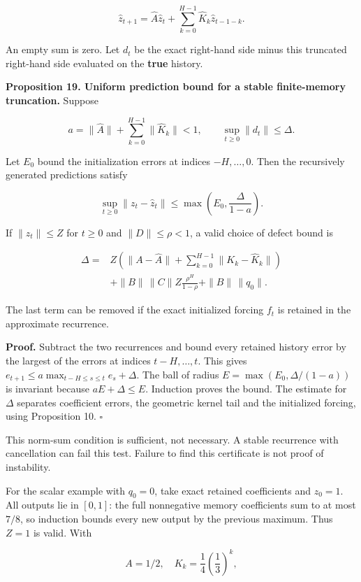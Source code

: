 \[
\widehat z_{t+1}=\widehat A\widehat z_t+
\sum_{k=0}^{H-1}\widehat K_k\widehat z_{t-1-k}.
\]

An empty sum is zero. Let \(d_t\) be the exact right-hand side minus
this truncated right-hand side evaluated on the \textbf{true} history.

\textbf{Proposition 19. Uniform prediction bound for a stable
finite-memory truncation.} Suppose

\[
a=\|\widehat A\|+\sum_{k=0}^{H-1}\|\widehat K_k\|<1,
\qquad\sup_{t\geq0}\|d_t\|\leq\Delta.
\]

Let \(E_0\) bound the initialization errors at indices \(-H,\ldots,0\).
Then the recursively generated predictions satisfy

\[
\boxed{
\sup_{t\geq0}\|z_t-\widehat z_t\|
\leq\max\left(E_0,\frac{\Delta}{1-a}\right).
}
\]

If \(\|z_t\|\leq Z\) for \(t\geq0\) and \(\|D\|\leq\rho<1\), a valid
choice of defect bound is

\[
\begin{aligned}
\Delta={}&Z\left(\|A-\widehat A\|
+\sum_{k=0}^{H-1}\|K_k-\widehat K_k\|\right)\\
&+\|B\|\,\|C\|Z\frac{\rho^H}{1-\rho}
+\|B\|\,\|q_0\|.
\end{aligned}
\]

The last term can be removed if the exact initialized forcing \(f_t\) is
retained in the approximate recurrence.

\textbf{Proof.} Subtract the two recurrences and bound every retained
history error by the largest of the errors at indices \(t-H,\ldots,t\).
This gives \(e_{t+1}\leq a\max_{t-H\leq s\leq t}e_s+\Delta\). The ball
of radius \(E=\max(E_0,\Delta/(1-a))\) is invariant because
\(aE+\Delta\leq E\). Induction proves the bound. The estimate for
\(\Delta\) separates coefficient errors, the geometric kernel tail and
the initialized forcing, using Proposition 10. \(\square\)

This norm-sum condition is sufficient, not necessary. A stable
recurrence with cancellation can fail this test. Failure to find this
certificate is not proof of instability.

For the scalar example with \(q_0=0\), take exact retained coefficients
and \(z_0=1\). All outputs lie in \([0,1]\): the full nonnegative memory
coefficients sum to at most \(7/8\), so induction bounds every new
output by the previous maximum. Thus \(Z=1\) is valid. With

\[
A=1/2,\quad K_k=\frac14\left(\frac13\right)^k,
\]

